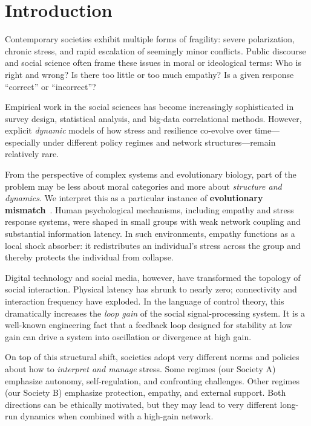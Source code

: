 \documentclass[11pt]{article}
\theoremstyle{plain}
\begin{document}
\section{Introduction}

Contemporary societies exhibit multiple forms of fragility: severe polarization, chronic stress, and rapid escalation of seemingly minor conflicts.
Public discourse and social science often frame these issues in moral or ideological terms:
Who is right and wrong?  
Is there too little or too much empathy?  
Is a given response ``correct'' or ``incorrect''?

Empirical work in the social sciences has become increasingly sophisticated in survey design, statistical analysis, and big-data correlational methods.
However, explicit \emph{dynamic} models of how stress and resilience co-evolve over time---especially under different policy regimes and network structures---remain relatively rare.

From the perspective of complex systems and evolutionary biology, part of the problem may be less about moral categories and more about \emph{structure and dynamics}.
We interpret this as a particular instance of \textbf{evolutionary mismatch}~\cite{lloyd2011evolutionary}.
Human psychological mechanisms, including empathy and stress response systems, were shaped in small groups with weak network coupling and substantial information latency.
In such environments, empathy functions as a local shock absorber: it redistributes an individual's stress across the group and thereby protects the individual from collapse.

Digital technology and social media, however, have transformed the topology of social interaction.
Physical latency has shrunk to nearly zero; connectivity and interaction frequency have exploded.
In the language of control theory, this dramatically increases the \emph{loop gain} of the social signal-processing system.
It is a well-known engineering fact that a feedback loop designed for stability at low gain can drive a system into oscillation or divergence at high gain.

On top of this structural shift, societies adopt very different norms and policies about how to \emph{interpret and manage} stress.
Some regimes (our Society A) emphasize autonomy, self-regulation, and confronting challenges.
Other regimes (our Society B) emphasize protection, empathy, and external support.
Both directions can be ethically motivated, but they may lead to very different long-run dynamics when combined with a high-gain network.
\end{document}
